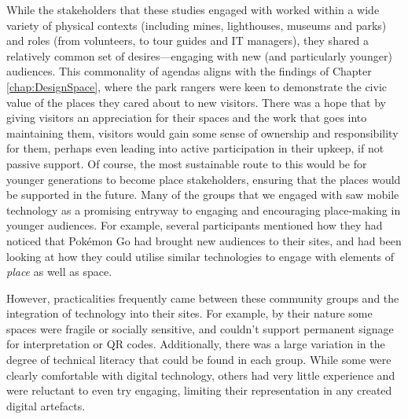 While the stakeholders that these studies engaged with worked within a wide variety of physical contexts (including mines, lighthouses, museums and parks) and roles (from volunteers, to tour guides and IT managers), they shared a relatively common set of desires---engaging with new (and particularly younger) audiences. This commonality of agendas aligns with the findings of Chapter \ref{chap:DesignSpace}, where the park rangers were keen to demonstrate the civic value of the places they cared about to new visitors. There was a hope that by giving visitors an appreciation for their spaces and the work that goes into maintaining them, visitors would gain some sense of ownership and responsibility for them, perhaps even leading into active participation in their upkeep, if not passive support. Of course, the most sustainable route to this would be for younger generations to become place stakeholders, ensuring that the places would be supported in the future. Many of the groups that we engaged with saw mobile technology as a promising entryway to engaging and encouraging place-making in younger audiences. For example, several participants mentioned how they had noticed that Pok\'emon Go had brought new audiences to their sites, and had been looking at how they could utilise similar technologies to engage with elements of \textit{place} as well as space.

However, practicalities frequently came between these community groups and the integration of technology into their sites. For example, by their nature some spaces were fragile or socially sensitive, and couldn't support permanent signage for interpretation or QR codes. Additionally, there was a large variation in the degree of technical literacy that could be found in each group. While some were clearly comfortable with digital technology, others had very little experience and were reluctant to even try engaging, limiting their representation in any created digital artefacts.

